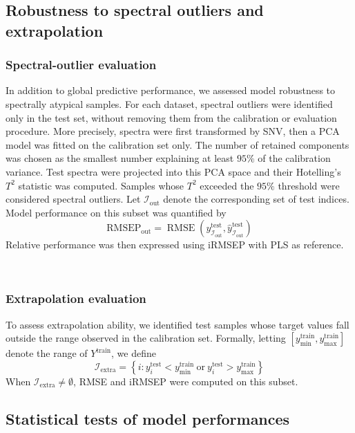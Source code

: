 \documentclass{article}
\begin{document}
\subsection{Robustness to spectral outliers and extrapolation}

\subsubsection{Spectral-outlier evaluation}
In addition to global predictive performance, we assessed model robustness to spectrally atypical samples. For each dataset, spectral outliers were identified only in the test set, without removing them from the calibration or evaluation procedure. More precisely, spectra were first transformed by SNV, then a PCA model was fitted on the calibration set only. The number of retained components was chosen as the smallest number explaining at least $95\%$ of the calibration variance. Test spectra were projected into this PCA space and their Hotelling's $T^2$ statistic \cite{hotelling_t2} was computed. Samples whose $T^2$ exceeded the $95\%$ threshold were considered spectral outliers. Let $\mathcal{I}_{\mathrm{out}}$ denote the corresponding set of test indices. Model performance on this subset was quantified by
\[
\mathrm{RMSEP}_{\mathrm{out}}
=
\operatorname{RMSE}\!\left(
y^{\mathrm{test}}_{\mathcal{I}_{\mathrm{out}}},
\hat{y}^{\mathrm{test}}_{\mathcal{I}_{\mathrm{out}}}
\right)
\]
Relative performance was then expressed using iRMSEP with PLS as reference.

~

\subsubsection{Extrapolation evaluation}
To assess extrapolation ability, we identified test samples whose target values fall outside the range observed in the calibration set. Formally, letting $[y_{\min}^{\mathrm{train}}, y_{\max}^{\mathrm{train}}]$ denote the range of $Y^{\mathrm{train}}$, we define
\[
\mathcal{I}_{\mathrm{extra}} =
\left\{
i : y_i^{\mathrm{test}} < y_{\min}^{\mathrm{train}}
\ \text{or}\
y_i^{\mathrm{test}} > y_{\max}^{\mathrm{train}}
\right\}
\]
When $\mathcal{I}_{\mathrm{extra}} \neq \emptyset$, RMSE and iRMSEP were computed on this subset.







\subsection{Statistical tests of model performances}
\end{document}
